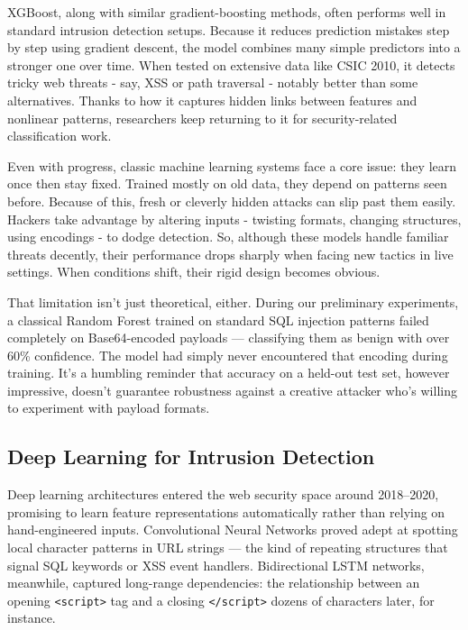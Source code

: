 \documentclass[journal,onecolumn]{IEEEtran}
\begin{document}
XGBoost, along with similar gradient-boosting methods, often performs well in standard intrusion detection setups. Because it reduces prediction mistakes step by step using gradient descent, the model combines many simple predictors into a stronger one over time. When tested on extensive data like CSIC 2010, it detects tricky web threats - say, XSS or path traversal - notably better than some alternatives. Thanks to how it captures hidden links between features and nonlinear patterns, researchers keep returning to it for security-related classification work.

Even with progress, classic machine learning systems face a core issue: they learn once then stay fixed. Trained mostly on old data, they depend on patterns seen before. Because of this, fresh or cleverly hidden attacks can slip past them easily. Hackers take advantage by altering inputs - twisting formats, changing structures, using encodings - to dodge detection. So, although these models handle familiar threats decently, their performance drops sharply when facing new tactics in live settings. When conditions shift, their rigid design becomes obvious.

That limitation isn't just theoretical, either. During our preliminary experiments, a classical Random Forest trained on standard SQL injection patterns failed completely on Base64-encoded payloads --- classifying them as benign with over 60\% confidence. The model had simply never encountered that encoding during training. It's a humbling reminder that accuracy on a held-out test set, however impressive, doesn't guarantee robustness against a creative attacker who's willing to experiment with payload formats.

\subsection{Deep Learning for Intrusion Detection}

Deep learning architectures entered the web security space around 2018--2020, promising to learn feature representations automatically rather than relying on hand-engineered inputs. Convolutional Neural Networks proved adept at spotting local character patterns in URL strings --- the kind of repeating structures that signal SQL keywords or XSS event handlers. Bidirectional LSTM networks, meanwhile, captured long-range dependencies: the relationship between an opening \texttt{<script>} tag and a closing \texttt{</script>} dozens of characters later, for instance.
\end{document}
